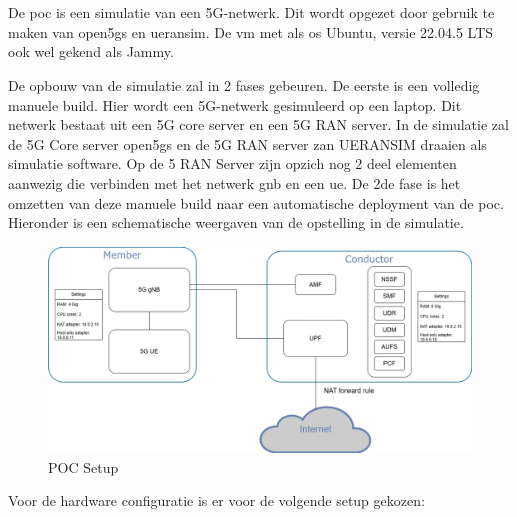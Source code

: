 \chapter{}%
\label{ch:poc}

\section{}%
\label{sec:sim}%
De \gls{poc} is een simulatie van een 5G-netwerk. Dit wordt opgezet door gebruik te maken van \gls{open5gs} en \gls{ueransim}. De \gls{vm} met als \gls{os} Ubuntu, versie 22.04.5 LTS ook wel gekend als Jammy. 

De opbouw van de simulatie zal in 2 fases gebeuren. De eerste is een volledig manuele build. Hier wordt een 5G-netwerk gesimuleerd op een laptop. Dit netwerk bestaat uit een 5G core server en een 5G RAN server. In de simulatie zal de 5G Core server \gls{open5gs} en de 5G RAN server zan UERANSIM draaien als simulatie software. Op de 5 RAN Server zijn opzich nog 2 deel elementen aanwezig die verbinden met het netwerk \gls{gnb} en een \gls{ue}. De 2de fase is het omzetten van deze manuele build naar een automatische deployment van de \gls{poc}. Hieronder is een schematische weergaven van de opstelling in de simulatie. 

\begin{figure}[H]
    \includegraphics[width=\linewidth]{../graphics/POC-setup.png}
    \caption{POC Setup}
    \label{fig:poc-setup}
\end{figure}

Voor de hardware configuratie is er voor de volgende setup gekozen:

